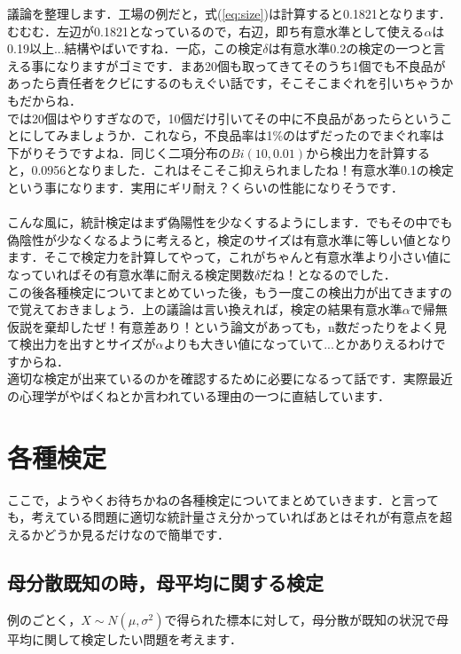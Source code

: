\documentclass[11pt,a4paper,uplatex]{ujreport} 	%
\begin{document}
議論を整理します．工場の例だと，式(\ref{eq:size})は計算すると0.1821となります．むむむ．左辺が0.1821となっているので，右辺，即ち有意水準として使える$\alpha$は0.19以上...結構やばいですね．一応，この検定$\delta$は有意水準0.2の検定の一つと言える事になりますがゴミです．まあ20個も取ってきてそのうち1個でも不良品があったら責任者をクビにするのもえぐい話です，そこそこまぐれを引いちゃうかもだからね．\\

では20個はやりすぎなので，10個だけ引いてその中に不良品があったらということにしてみましょうか．これなら，不良品率は1\%のはずだったのでまぐれ率は下がりそうですよね．同じく二項分布の$Bi(10,0.01)$から検出力を計算すると，0.0956となりました．これはそこそこ抑えられましたね！有意水準0.1の検定という事になります．実用にギリ耐え？くらいの性能になりそうです．\\
\\

こんな風に，統計検定はまず偽陽性を少なくするようにします．でもその中でも偽陰性が少なくなるように考えると，検定のサイズは有意水準に等しい値となります．そこで検定力を計算してやって，これがちゃんと有意水準より小さい値になっていればその有意水準に耐える検定関数$\delta$だね！となるのでした．\\

この後各種検定についてまとめていった後，もう一度この検出力が出てきますので覚えておきましょう．上の議論は言い換えれば，検定の結果有意水準$\alpha$で帰無仮説を棄却したぜ！有意差あり！という論文があっても，n数だったりをよく見て検出力を出すとサイズが$\alpha$よりも大きい値になっていて...とかありえるわけですからね．\\

適切な検定が出来ているのかを確認するために必要になるって話です．実際最近の心理学がやばくねとか言われている理由の一つに直結しています．

\section{各種検定}
ここで，ようやくお待ちかねの各種検定についてまとめていきます．と言っても，考えている問題に適切な統計量さえ分かっていればあとはそれが有意点を超えるかどうか見るだけなので簡単です．


\subsection{母分散既知の時，母平均に関する検定}
例のごとく，$X \sim N(\mu, \sigma^2)$で得られた標本に対して，母分散が既知の状況で母平均に関して検定したい問題を考えます．\\
\end{document}
